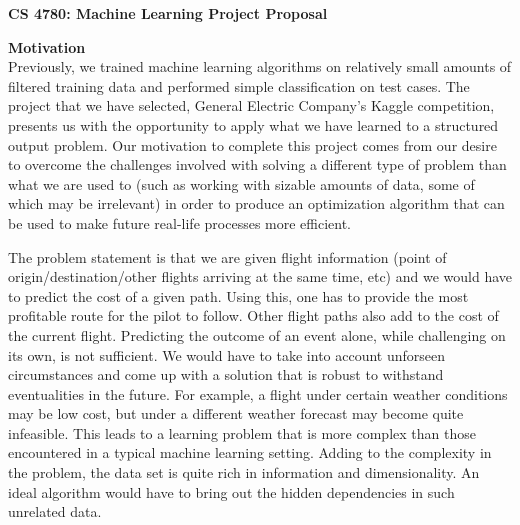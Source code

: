 \documentclass{article}[9pt]
\begin{document}
\begin{framed}
\noindent
\large{\textbf{CS 4780: Machine Learning \hfill Project Proposal}}
\end{framed}

\noindent\Large{\textbf{Motivation}}\\
\noindent Previously, we trained machine learning algorithms on relatively small amounts of filtered training data and performed simple classification on test cases. The project that we have selected, General Electric Company's Kaggle competition, presents us with the opportunity to apply what we have learned to a structured output problem. Our motivation to complete this project comes from our desire to overcome the challenges involved with solving a different type of problem than what we are used to (such as working with sizable amounts of data, some of which may be irrelevant) in order to produce an optimization algorithm that can be used to make future real-life processes more efficient.

The problem statement is that we are given flight information (point of origin/destination/other flights arriving at the same time, etc) and we would have to predict the cost of a given path. Using this, one has to provide the most profitable route for the pilot to follow. Other flight paths also add to the cost of the current flight. Predicting the outcome of an event alone, while challenging on its own, is not sufficient. We would have to take into account unforseen circumstances and come up with a solution that is robust to withstand eventualities in the future. For example, a flight under certain weather conditions may be low cost, but under a different weather forecast may become quite infeasible. This leads to a learning problem that is more complex than those encountered in a typical machine learning setting. Adding to the complexity in the problem, the data set is quite rich in information and dimensionality. An ideal algorithm would have to bring out the hidden dependencies in such unrelated data.
\end{document}
